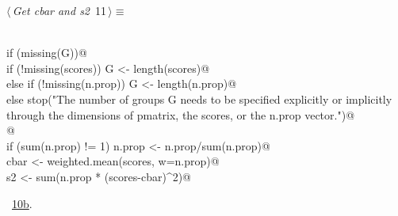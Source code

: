 \documentclass[reqno]{amsart}
\renewcommand{\NWtarget}[2]{\hypertarget{#1}{#2}}
\renewcommand{\NWlink}[2]{\hyperlink{#1}{#2}}
\begin{document}
\begin{flushleft} \small\label{scrap17}\raggedright\small
\NWtarget{nuweb11}{} $\langle\,${\itshape Get cbar and s2}\nobreak\ {\footnotesize {11}}$\,\rangle\equiv$
\vspace{-1ex}
\begin{list}{}{} \item
\mbox{}\verb@@\\
\mbox{}\verb@    if (missing(G)){@\\
\mbox{}\verb@      if (!missing(scores)) G <- length(scores)@\\
\mbox{}\verb@      else if (!missing(n.prop)) G <- length(n.prop)@\\
\mbox{}\verb@      else stop("The number of groups G needs to be specified explicitly or implicitly through the dimensions of pmatrix, the scores, or the n.prop vector.")@\\
\mbox{}\verb@    }@\\
\mbox{}\verb@    if (sum(n.prop) != 1) n.prop <- n.prop/sum(n.prop)@\\
\mbox{}\verb@    cbar <- weighted.mean(scores, w=n.prop)@\\
\mbox{}\verb@    s2 <- sum(n.prop * (scores-cbar)^2)@\\
\mbox{}\verb@@{\NWsep}
\end{list}
\vspace{-1.5ex}
\footnotesize
\begin{list}{}{\setlength{\itemsep}{-\parsep}\setlength{\itemindent}{-\leftmargin}}
\item \NWtxtMacroRefIn\ \NWlink{nuweb10b}{10b}.

\item{}
\end{list}
\vspace{4ex}
\end{flushleft}
\end{document}
